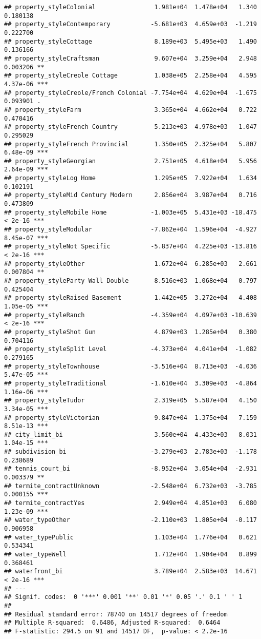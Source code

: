 \documentclass[
]{article}
\begin{document}
\begin{verbatim}
## property_styleColonial                1.981e+04  1.478e+04   1.340 0.180138    
## property_styleContemporary           -5.681e+03  4.659e+03  -1.219 0.222700    
## property_styleCottage                 8.189e+03  5.495e+03   1.490 0.136166    
## property_styleCraftsman               9.607e+04  3.259e+04   2.948 0.003206 ** 
## property_styleCreole Cottage          1.038e+05  2.258e+04   4.595 4.37e-06 ***
## property_styleCreole/French Colonial -7.754e+04  4.629e+04  -1.675 0.093901 .  
## property_styleFarm                    3.365e+04  4.662e+04   0.722 0.470416    
## property_styleFrench Country          5.213e+03  4.978e+03   1.047 0.295029    
## property_styleFrench Provincial       1.350e+05  2.325e+04   5.807 6.48e-09 ***
## property_styleGeorgian                2.751e+05  4.618e+04   5.956 2.64e-09 ***
## property_styleLog Home                1.295e+05  7.922e+04   1.634 0.102191    
## property_styleMid Century Modern      2.856e+04  3.987e+04   0.716 0.473809    
## property_styleMobile Home            -1.003e+05  5.431e+03 -18.475  < 2e-16 ***
## property_styleModular                -7.862e+04  1.596e+04  -4.927 8.45e-07 ***
## property_styleNot Specific           -5.837e+04  4.225e+03 -13.816  < 2e-16 ***
## property_styleOther                   1.672e+04  6.285e+03   2.661 0.007804 ** 
## property_styleParty Wall Double       8.516e+03  1.068e+04   0.797 0.425404    
## property_styleRaised Basement         1.442e+05  3.272e+04   4.408 1.05e-05 ***
## property_styleRanch                  -4.359e+04  4.097e+03 -10.639  < 2e-16 ***
## property_styleShot Gun                4.879e+03  1.285e+04   0.380 0.704116    
## property_styleSplit Level            -4.373e+04  4.041e+04  -1.082 0.279165    
## property_styleTownhouse              -3.516e+04  8.713e+03  -4.036 5.47e-05 ***
## property_styleTraditional            -1.610e+04  3.309e+03  -4.864 1.16e-06 ***
## property_styleTudor                   2.319e+05  5.587e+04   4.150 3.34e-05 ***
## property_styleVictorian               9.847e+04  1.375e+04   7.159 8.51e-13 ***
## city_limit_bi                         3.560e+04  4.433e+03   8.031 1.04e-15 ***
## subdivision_bi                       -3.279e+03  2.783e+03  -1.178 0.238689    
## tennis_court_bi                      -8.952e+04  3.054e+04  -2.931 0.003379 ** 
## termite_contractUnknown              -2.548e+04  6.732e+03  -3.785 0.000155 ***
## termite_contractYes                   2.949e+04  4.851e+03   6.080 1.23e-09 ***
## water_typeOther                      -2.110e+03  1.805e+04  -0.117 0.906958    
## water_typePublic                      1.103e+04  1.776e+04   0.621 0.534341    
## water_typeWell                        1.712e+04  1.904e+04   0.899 0.368461    
## waterfront_bi                         3.789e+04  2.583e+03  14.671  < 2e-16 ***
## ---
## Signif. codes:  0 '***' 0.001 '**' 0.01 '*' 0.05 '.' 0.1 ' ' 1
## 
## Residual standard error: 78740 on 14517 degrees of freedom
## Multiple R-squared:  0.6486, Adjusted R-squared:  0.6464 
## F-statistic: 294.5 on 91 and 14517 DF,  p-value: < 2.2e-16
\end{verbatim}
\end{document}
